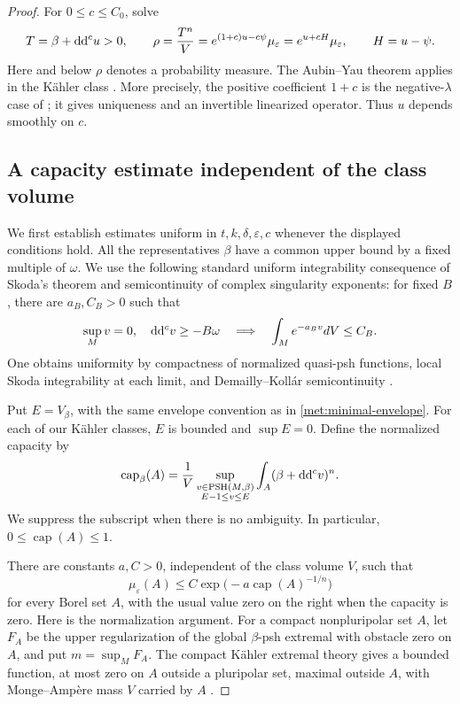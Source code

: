 \begin{proof}
For \(0\leq c\leq C_0\), solve
\begin{equation}
 \label{met:ma-family}
 T=\beta+\mathrm{d}\mathrm{d}^{c} u>0,
 \qquad
 \rho=\frac{T^n}{V}
   =e^{(1+c)u-c\psi}\mu_\varepsilon
   =e^{u+cH}\mu_\varepsilon,
 \qquad H=u-\psi.
\end{equation}
Here and below \(\rho\) denotes a probability measure.  The
Aubin--Yau theorem applies in the K\"ahler class
\cite{AubinMongeAmpere,YauCalabi}.  More precisely, the positive
coefficient \(1+c\) is the negative-\(\lambda\) case of
\cite[Theorem 7.14]{AubinBook1998}; it gives uniqueness and an
invertible linearized operator.  Thus \(u\) depends smoothly on \(c\).

\subsection*{A capacity estimate independent of the class volume}

We first establish estimates uniform in \(t,k,\delta,\varepsilon,c\)
whenever the displayed conditions hold.  All the representatives
\(\beta\) have a common upper bound by a fixed multiple of \(\omega\).
We use the following standard uniform integrability consequence of
Skoda's theorem and semicontinuity of complex singularity exponents:
for fixed \(B\), there are \(a_B,C_B>0\) such that
\begin{equation}
 \label{met:uniform-skoda}
 \sup_M v=0,\quad \mathrm{d}\mathrm{d}^{c} v\geq-B\omega
 \quad\Longrightarrow\quad
 \int_M e^{-a_Bv}dV\leq C_B.
\end{equation}
One obtains uniformity by compactness of normalized quasi-psh
functions, local Skoda integrability at each limit, and
Demailly--Koll\'ar semicontinuity
\cite{SkodaIntegrability,DemaillyKollar}.

Put \(E=V_\beta\), with the same envelope convention as in
\eqref{met:minimal-envelope}.  For each of our K\"ahler classes, \(E\)
is bounded and \(\sup E=0\).  Define the normalized capacity by
\begin{equation}
 \label{met:capacity}
 \operatorname{cap}_\beta(A)
 =\frac1V\sup_{\substack{v\in\operatorname{PSH}(M,\beta)\\E-1\leq v\leq E}}
       \int_A(\beta+\mathrm{d}\mathrm{d}^{c} v)^n.
\end{equation}
We suppress the subscript when there is no ambiguity.  In particular,
\(0\leq\operatorname{cap}(A)\leq1\).

There are constants \(a,C>0\), independent of the class volume \(V\),
such that
\begin{equation}
 \label{met:exponential-capacity}
 \mu_\varepsilon(A)
 \leq C\exp\bigl(-a\operatorname{cap}(A)^{-1/n}\bigr)
\end{equation}
for every Borel set \(A\), with the usual value zero on the right when
the capacity is zero.  Here is the normalization argument.  For a
compact nonpluripolar set \(A\), let \(F_A\) be the upper regularization
of the global \(\beta\)-psh extremal with obstacle zero on \(A\), and
put \(m=\sup_M F_A\).  The compact K\"ahler extremal theory gives a
bounded function, at most zero on \(A\) outside a pluripolar set,
maximal outside \(A\), with Monge--Amp\`ere mass \(V\) carried by \(A\)
\cite[Sections 5--7]{GuedjZeriahiCapacity}.


\end{proof}
